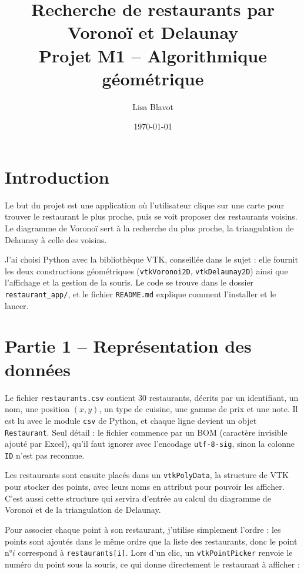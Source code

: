 \documentclass[11pt,a4paper]{article}
\title{Recherche de restaurants par Voronoï et Delaunay\\[0.3em]
       \large Projet M1 -- Algorithmique géométrique}
\author{Lisa Blavot}
\date{\today}
\begin{document}
\maketitle

\section{Introduction}

Le but du projet est une application où l'utilisateur clique sur une carte
pour trouver le restaurant le plus proche, puis se voit proposer des
restaurants voisins. Le diagramme de Voronoï sert à la recherche du plus
proche, la triangulation de Delaunay à celle des voisins.

J'ai choisi Python avec la bibliothèque VTK, conseillée dans le sujet : elle
fournit les deux constructions géométriques (\texttt{vtkVoronoi2D},
\texttt{vtkDelaunay2D}) ainsi que l'affichage et la gestion de la souris. Le
code se trouve dans le dossier \texttt{restaurant\_app/}, et le fichier
\texttt{README.md} explique comment l'installer et le lancer.

\section{Partie 1 -- Représentation des données}

Le fichier \texttt{restaurants.csv} contient 30 restaurants, décrits par un
identifiant, un nom, une position $(x, y)$, un type de cuisine, une gamme de
prix et une note. Il est lu avec le module \texttt{csv} de Python, et chaque
ligne devient un objet \texttt{Restaurant}. Seul détail : le fichier commence
par un BOM (caractère invisible ajouté par Excel), qu'il faut ignorer avec
l'encodage \texttt{utf-8-sig}, sinon la colonne \texttt{ID} n'est pas reconnue.

Les restaurants sont ensuite placés dans un \texttt{vtkPolyData}, la
structure de VTK pour stocker des points, avec leurs noms en attribut pour
pouvoir les afficher. C'est aussi cette structure qui servira d'entrée au
calcul du diagramme de Voronoï et de la triangulation de Delaunay.

Pour associer chaque point à son restaurant, j'utilise simplement l'ordre :
les points sont ajoutés dans le même ordre que la liste des restaurants, donc
le point n°$i$ correspond à \texttt{restaurants[i]}. Lors d'un clic, un
\texttt{vtkPointPicker} renvoie le numéro du point sous la souris, ce qui
donne directement le restaurant à afficher :
\end{document}
